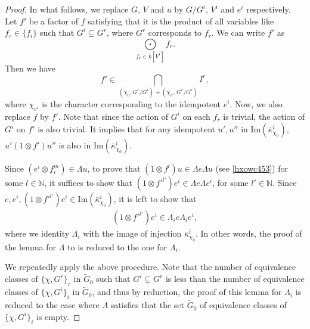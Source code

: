 \documentclass[11pt,reqno]{amsart}
\theoremstyle{definition}
\begin{document}
\begin{proof}
In what follows, we replace $G$, $V$ 
and $u$ by $G/G^i$, $V^i$ and $e^i$ 
respectively. Let $f'$ be a factor of $f$ 
satisfying 
that it is the product of 
all variables like $f_r \in \{ f_i \}
$ 
such that $G^i \subsetneq G^r $, 
where $G^r$ corresponds to $f_r$. 
We can write $f'$ as
$$
\bigodot\limits_{f_r \in k[V^i]} f_r. 
$$
Then we have 
$$ f' \in \bigcap\limits_{(\chi_0, G^r/G^i) \not\sim (\chi_{e^i}, G^r/G^i)}  I^r,
$$ 
where $\chi_{e^i}$ is the character corresponding to the
idempotent $e^i$. Now, we also replace $f$ by $f'$. 
Note that since the action of $G^i$ on each $f_r$ is trivial, 
the action of $G^i$ on $f'$ is also trivial.
It implies that for any idempotent $u', u''$ in $\mathrm{Im}(\bar{\kappa}^i_{\chi_0})$, 
$u'(1 \otimes f')u''$ is also in $\mathrm{Im}(\bar{\kappa}^i_{\chi_0})$. 


Since $(e^i \otimes f_i^{m}) \in \Lambda u $, to prove that 
$(1 \otimes f^l)u \in \Lambda e \Lambda u$
(see \ref{hxowc453}) for some 
$l \in \mathbb{N}$, 
it suffices to show that
$(1 \otimes f'^{l'})e^i \in \Lambda e \Lambda e^i$, for some
$l' \in \mathbb{N}$. 
Since $e, e^i, (1 \otimes f'^{l'})e^i \in 
\mathrm{Im}(\bar{\kappa}^i_{\chi_0})$, it is left to show that 
\begin{align}\label{ncivfbg}
	(1 \otimes f'^{l'})e^i \in \Lambda_i e \Lambda_i e^{i},
\end{align}
 where 
we identity $\Lambda_i$ with the image 
of injection $\bar{\kappa}^i_{\chi_0}$. 
In other words,
the proof of the lemma for $\Lambda$ to 
is reduced to the one for $\Lambda_i$. 

\vspace{2mm}

We repeatedly apply the above procedure. 
Note that the number of equivalence classes
of $\{\chi, G^r\}_r$ in $\tilde{G}_0$ 
such that $G^i \subsetneq G^r$
is less than the number of equivalence
classes of $\{\chi, G^i\}_i$ in 
$\tilde{G}_0$, and thus
by reduction, the proof of this lemma for $\Lambda_i$ 
is reduced to the case 
where $\Lambda$ satisfies that
the set $\tilde{G}_0$ of equivalence classes of $\{\chi, G^i\}_i$ is empty. 


\end{proof}
\end{document}
